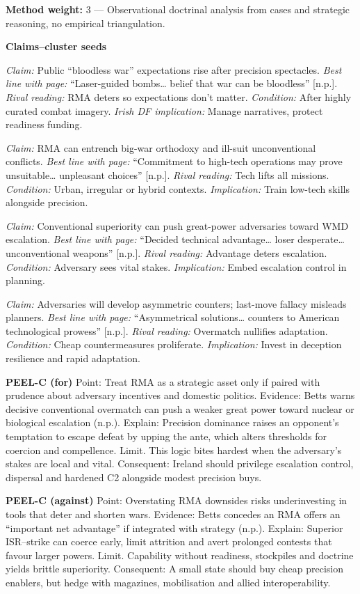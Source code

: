 \textbf{Method weight:} 3 — Observational doctrinal analysis from cases and strategic reasoning, no empirical triangulation.

\textbf{Claims–cluster seeds}

\textit{Claim:} Public “bloodless war” expectations rise after precision spectacles. \textit{Best line with page:} “Laser-guided bombs… belief that war can be bloodless” [n.p.]. \textit{Rival reading:} RMA deters so expectations don’t matter. \textit{Condition:} After highly curated combat imagery. \textit{Irish DF implication:} Manage narratives, protect readiness funding.

\textit{Claim:} RMA can entrench big-war orthodoxy and ill-suit unconventional conflicts. \textit{Best line with page:} “Commitment to high-tech operations may prove unsuitable… unpleasant choices” [n.p.]. \textit{Rival reading:} Tech lifts all missions. \textit{Condition:} Urban, irregular or hybrid contexts. \textit{Implication:} Train low-tech skills alongside precision.

\textit{Claim:} Conventional superiority can push great-power adversaries toward WMD escalation. \textit{Best line with page:} “Decided technical advantage… loser desperate… unconventional weapons” [n.p.]. \textit{Rival reading:} Advantage deters escalation. \textit{Condition:} Adversary sees vital stakes. \textit{Implication:} Embed escalation control in planning.

\textit{Claim:} Adversaries will develop asymmetric counters; last-move fallacy misleads planners. \textit{Best line with page:} “Asymmetrical solutions… counters to American technological prowess” [n.p.]. \textit{Rival reading:} Overmatch nullifies adaptation. \textit{Condition:} Cheap countermeasures proliferate. \textit{Implication:} Invest in deception resilience and rapid adaptation.

\textbf{PEEL-C (for)}
Point: Treat RMA as a strategic asset only if paired with prudence about adversary incentives and domestic politics.
Evidence: Betts warns decisive conventional overmatch can push a weaker great power toward nuclear or biological escalation (n.p.).
Explain: Precision dominance raises an opponent’s temptation to escape defeat by upping the ante, which alters thresholds for coercion and compellence.
Limit. This logic bites hardest when the adversary’s stakes are local and vital.
Consequent: Ireland should privilege escalation control, dispersal and hardened C2 alongside modest precision buys.

\textbf{PEEL-C (against)}
Point: Overstating RMA downsides risks underinvesting in tools that deter and shorten wars.
Evidence: Betts concedes an RMA offers an “important net advantage” if integrated with strategy (n.p.).
Explain: Superior ISR–strike can coerce early, limit attrition and avert prolonged contests that favour larger powers.
Limit. Capability without readiness, stockpiles and doctrine yields brittle superiority.
Consequent: A small state should buy cheap precision enablers, but hedge with magazines, mobilisation and allied interoperability.

